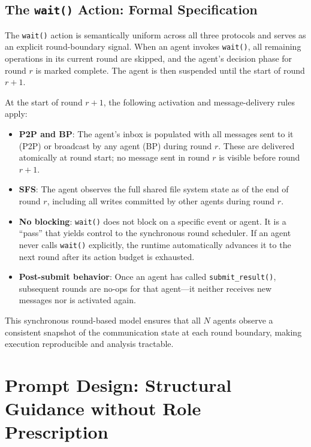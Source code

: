 \subsection{The \texttt{wait()} Action: Formal Specification}
\label{app:wait_spec}

The \texttt{wait()} action is semantically uniform across all three protocols and serves as an explicit round-boundary signal. When an agent invokes \texttt{wait()}, all remaining operations in its current round are skipped, and the agent's decision phase for round $r$ is marked complete. The agent is then suspended until the start of round $r{+}1$.

At the start of round $r{+}1$, the following activation and message-delivery rules apply:

\begin{itemize}[leftmargin=*,nosep]
    \item \textbf{P2P and BP}: The agent's inbox is populated with all messages sent to it (P2P) or broadcast by any agent (BP) during round $r$. These are delivered atomically at round start; no message sent in round $r$ is visible before round $r{+}1$.
    \item \textbf{SFS}: The agent observes the full shared file system state as of the end of round $r$, including all writes committed by other agents during round $r$.
    \item \textbf{No blocking}: \texttt{wait()} does not block on a specific event or agent. It is a ``pass'' that yields control to the synchronous round scheduler. If an agent never calls \texttt{wait()} explicitly, the runtime automatically advances it to the next round after its action budget is exhausted.
    \item \textbf{Post-submit behavior}: Once an agent has called \texttt{submit\_result()}, subsequent rounds are no-ops for that agent---it neither receives new messages nor is activated again.
\end{itemize}

This synchronous round-based model ensures that all $N$ agents observe a consistent snapshot of the communication state at each round boundary, making execution reproducible and analysis tractable.



\section{Prompt Design: Structural Guidance without Role Prescription}
\label{app:prompt_design}

